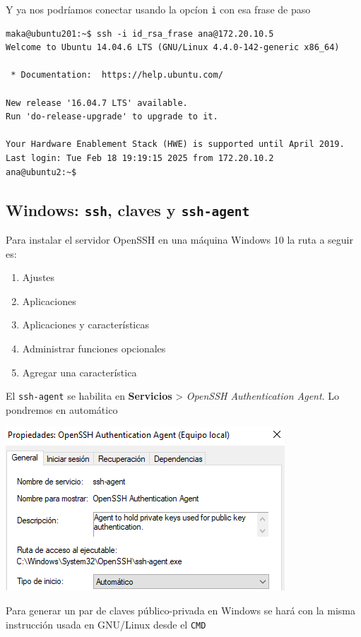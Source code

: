 \documentclass[11pt]{article}
\begin{document}
Y ya nos podríamos conectar usando la opcíon \texttt{i} con esa frase de paso
\begin{verbatim}
maka@ubuntu201:~$ ssh -i id_rsa_frase ana@172.20.10.5
Welcome to Ubuntu 14.04.6 LTS (GNU/Linux 4.4.0-142-generic x86_64)

 * Documentation:  https://help.ubuntu.com/

New release '16.04.7 LTS' available.
Run 'do-release-upgrade' to upgrade to it.

Your Hardware Enablement Stack (HWE) is supported until April 2019.
Last login: Tue Feb 18 19:19:15 2025 from 172.20.10.2
ana@ubuntu2:~$ 
\end{verbatim}
\subsection{Windows: \texttt{ssh}, claves y \texttt{ssh-agent}}
\label{sec:org609b1a8}
Para instalar el servidor OpenSSH en una máquina Windows 10 la ruta a seguir es:
\begin{enumerate}
\item Ajustes
\item Aplicaciones
\item Aplicaciones y características
\item Administrar funciones opcionales
\item Agregar una característica
\end{enumerate}

El \texttt{ssh-agent} se habilita en \textbf{Servicios} > \emph{OpenSSH Authentication Agent}. Lo pondremos en automático

\begin{center}
\includegraphics[width=.9\linewidth]{./media/ssh-agent-win.png}
\end{center}

Para generar un par de claves público-privada en Windows se hará con la misma instrucción usada en GNU/Linux desde el \texttt{CMD}
\end{document}
